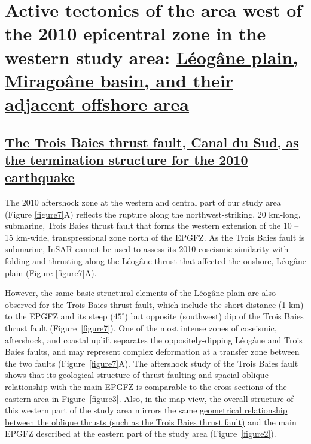 \documentclass[linenumbers,draft]{agujournal}
\begin{document}
\section{Active tectonics of the area west of the 2010 epicentral zone in the western study area: \ul{L\'eog\^ane plain, Mirago\^ane basin, and their adjacent offshore area}}
\subsection{\ul{The Trois Baies thrust fault, Canal du Sud, as the termination structure for the 2010 earthquake}}
The 2010 aftershock zone at the western and central part of our study area (Figure \ref{figure7}A) reflects the rupture along the northwest-striking, 20 km-long, submarine, Trois Baies thrust fault that forms the western extension of the 10 -- 15 km-wide, transpressional zone north of the EPGFZ. As the Trois Baies fault is submarine, InSAR cannot be used to assess its 2010 coseismic similarity with folding and thrusting along the L\'eog\^ane thrust that affected the onshore, L\'eog\^ane plain (Figure \ref{figure7}A). 

However, the same basic structural elements of the L\'eog\^ane plain are also observed for the Trois Baies thrust fault, which include the short distance (1 km) to the EPGFZ and its steep ($45^{\circ}$) but opposite (southwest) dip of the Trois Baies thrust fault (Figure~\ref{figure7}). One of the most intense zones of coseismic, aftershock, and coastal uplift separates the oppositely-dipping L\'eog\^ane and Trois Baies faults, and may represent complex deformation at a transfer zone between the two faults (Figure~\ref{figure7}A). The aftershock study of the Trois Baies fault \citep{symithe2016present} shows that \ul{its geological structure of thrust faulting and spacial oblique relationship with the main EPGFZ} is comparable to the cross sections of the eastern area in Figure~\ref{figure3}. Also, in the map view, the overall structure of this western part of the study area mirrors the same \ul{geometrical relationship between the oblique thrusts (such as the Trois Baies thrust fault)} and the main EPGFZ described at the eastern part of the study area (Figure~\ref{figure2}).
\end{document}
